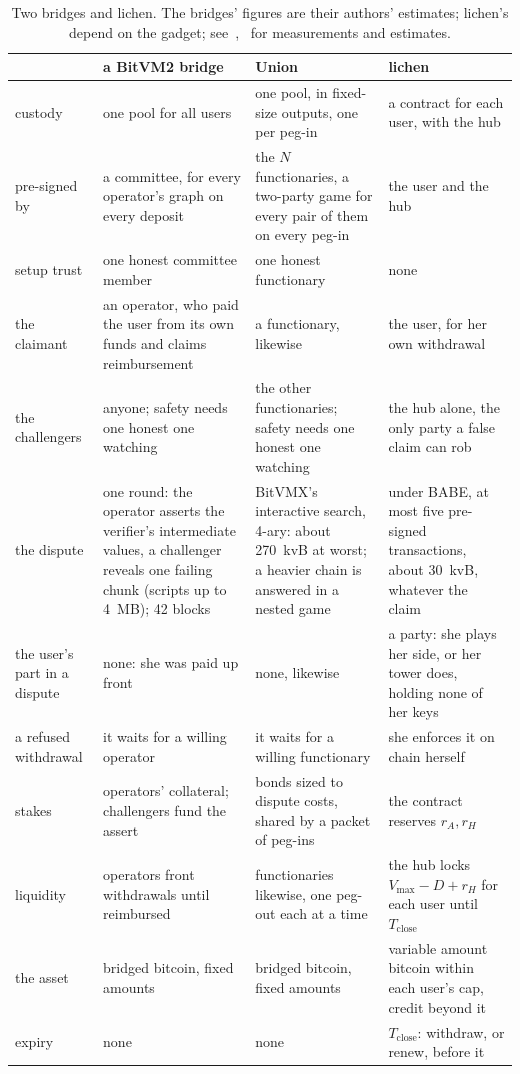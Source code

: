 \documentclass[11pt]{article}
\newcommand{\vmax}{V_{\max}}
\newcommand{\Tc}{T_{\mathrm{close}}}
\begin{document}
\begin{table}[!tp]
\centering
\small
\begin{tabularx}{\linewidth}{>{\raggedright\arraybackslash}p{21mm}LLL}
\toprule
& a BitVM2 bridge & Union & lichen \\
\midrule
custody & one pool for all users & one pool, in fixed-size outputs, one per peg-in & a contract for each user, with the hub \\
pre-signed by & a committee, for every operator's graph on every deposit & the $N$ functionaries, a two-party game for every pair of them on every peg-in & the user and the hub \\
setup trust & one honest committee member & one honest functionary & none \\
the claimant & an operator, who paid the user from its own funds and claims reimbursement & a functionary, likewise & the user, for her own withdrawal \\
the challengers & anyone; safety needs one honest one watching & the other functionaries; safety needs one honest one watching & the hub alone, the only party a false claim can rob \\
the dispute & one round: the operator asserts the verifier's intermediate values, a challenger reveals one failing chunk (scripts up to 4~MB); 42 blocks & BitVMX's interactive search, 4-ary: about 270~kvB at worst; a heavier chain is answered in a nested game & under BABE, at most five pre-signed transactions, about 30~kvB, whatever the claim \\
the user's part in a dispute & none: she was paid up front & none, likewise & a party: she plays her side, or her tower does, holding none of her keys \\
a refused withdrawal & it waits for a willing operator & it waits for a willing functionary & she enforces it on chain herself \\
stakes & operators' collateral; challengers fund the assert & bonds sized to dispute costs, shared by a packet of peg-ins & the contract reserves $r_A, r_H$ \\
liquidity & operators front withdrawals until reimbursed & functionaries likewise, one peg-out each at a time & the hub locks $\vmax - D + r_H$ for each user until $\Tc$ \\
the asset & bridged bitcoin, fixed amounts & bridged bitcoin, fixed amounts & variable amount bitcoin within each user's cap, credit beyond it \\
expiry & none & none & $\Tc$: withdraw, or renew, before it \\
\bottomrule
\end{tabularx}
\caption{Two bridges and lichen. The bridges' figures are their
authors' estimates; lichen's depend on the gadget; see~\cite{lichenbitvmx},~\cite{lichenbabe} for measurements and estimates.}
\label{tab:bitvm2}
\end{table}
\end{document}
